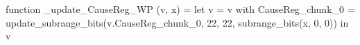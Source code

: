 function _update_CauseReg_WP (v, x) = let v = { v with CauseReg_chunk_0 = update_subrange_bits(v.CauseReg_chunk_0, 22, 22, subrange_bits(x, 0, 0)) } in
  v
